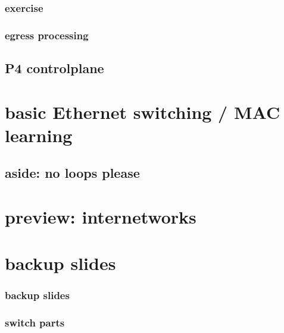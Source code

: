 \subsubsection{exercise}

\subsubsection{egress processing}


\subsection{P4 controlplane}


\section{basic Ethernet switching / MAC learning}






\subsection{aside: no loops please}



\section{preview: internetworks}





\section{backup slides}
\begin{frame}\frametitle{backup slides}
\end{frame}



\subsubsection{switch parts}



